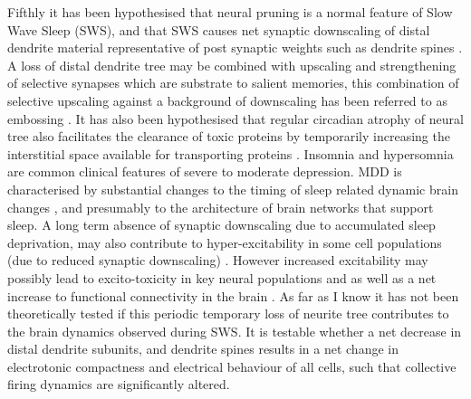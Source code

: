 \documentclass[a4paper,11pt]{article}
\begin{document}
Fifthly it has been hypothesised that neural pruning is a normal feature of Slow Wave Sleep (SWS), and that SWS causes net synaptic downscaling of distal dendrite material representative of post synaptic weights such as dendrite spines \cite{tononi2003sleep}. A loss of distal dendrite tree may be combined with upscaling and strengthening of selective synapses which are substrate to salient memories, this combination of selective upscaling against a background of downscaling has been referred to as embossing \cite{ribeiro2012sleep}. It has also been hypothesised that regular circadian atrophy of neural tree also facilitates the clearance of toxic proteins by temporarily increasing the interstitial space available for transporting proteins \cite{mckinley2013don}. Insomnia and hypersomnia are common clinical features of severe to moderate depression. MDD is characterised by substantial changes to the timing of sleep related dynamic brain changes \cite{srinivasan2009pathophysiology}, and presumably to the architecture of brain networks that support sleep. A long term absence of synaptic downscaling due to accumulated sleep deprivation, may also contribute to hyper-excitability in some cell populations (due to reduced synaptic downscaling) \cite{sarasso2014quantifying}. However increased excitability may possibly lead to excito-toxicity in key neural populations and as well as a net increase to functional connectivity in the brain \cite{sarasso2014quantifying}. As far as I know it has not been theoretically tested if this periodic temporary loss of neurite tree contributes to the brain dynamics observed during SWS. It is testable whether a net decrease in distal dendrite subunits, and dendrite spines results in a net change in electrotonic compactness and electrical behaviour of all cells, such that collective firing dynamics are significantly altered. 

\end{document}
